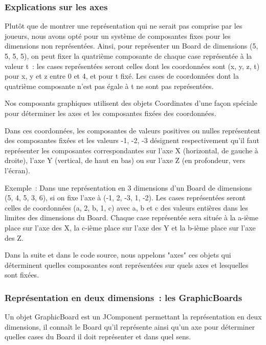 \subsubsection{Explications sur les axes}

	Plutôt que de montrer une représentation qui ne serait pas comprise par les joueurs, nous avons opté pour un système de composantes fixes pour les dimensions non représentées. Ainsi, pour représenter un Board de dimensions (5, 5, 5, 5), on peut fixer la quatrième composante de chaque case représentée à la valeur t~: les cases représentées seront celles dont les coordonnées sont (x, y, z, t) pour x, y et z entre 0 et 4, et pour t fixé. Les cases de coordonnées dont la quatrième composante n'est pas égale à t ne sont pas représentées.
\newline

	Nos composants graphiques utilisent des objets Coordinates d'une façon spéciale pour déterminer les axes et les composantes fixées des coordonnées.
	\newline	
	
	Dans ces coordonnées, les composantes de valeurs positives ou nulles représentent des composantes fixées et les valeurs -1, -2, -3 désignent respectivement qu'il faut représenter les composantes correspondantes sur l'axe X (horizontal, de gauche à droite), l'axe Y (vertical, de haut en bas) ou sur l'axe Z (en profondeur, vers l'écran).
\newline
	
	Exemple~: Dans une représentation en 3 dimensions d'un Board de dimensions (5, 4, 5, 3, 6), si on fixe l'axe à (-1, 2, -3, 1, -2). Les cases représentées seront celles de coordonnées (a, 2, b, 1, c) avec a, b et c des valeurs entières dans les limites des dimensions du Board.
Chaque case représentée sera située à la a-ième place sur l'axe des X, la c-ième place sur l'axe des Y et la b-ième place sur l'axe des Z.
\newline

	Dans la suite et dans le code source, nous appelons "axes" ces objets qui déterminent quelles composantes sont représentées sur quels axes et lesquelles sont fixées.

\subsubsection{Représentation en deux dimensions~: les GraphicBoards}


	Un objet GraphicBoard est un JComponent permettant la représentation en deux dimensions, il connaît le Board qu'il représente ainsi qu'un axe pour déterminer quelles cases du Board il doit représenter et dans quel sens. \newline


